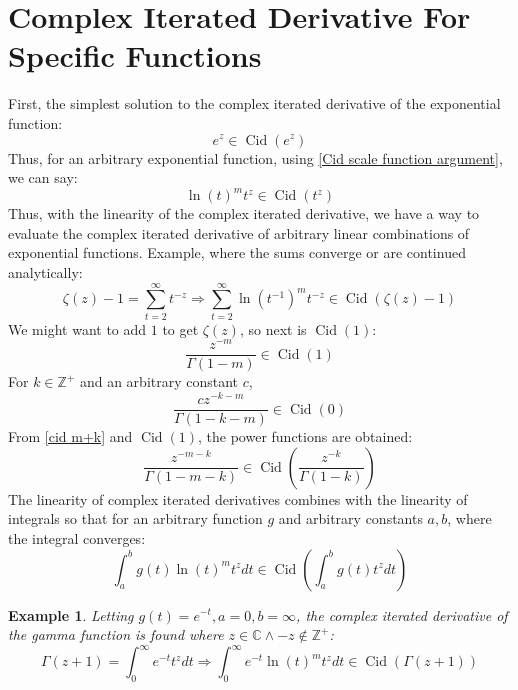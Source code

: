 \documentclass[]{article}
\DeclareMathOperator{\Cid}{Cid}
\newcommand{\pqty}[1]{{\left(#1\right)}}
\newtheorem{example}{Example}[section]
\numberwithin{equation}{section}
\begin{document}
	\section{Complex Iterated Derivative For Specific Functions}
	First, the simplest solution to the complex iterated derivative of the exponential function:
	\begin{equation}
		e^z\in \Cid\pqty{e^z}
	\end{equation}
	Thus, for an arbitrary exponential function, using \eqref{Cid scale function argument}, we can say:
	\begin{equation}
		\ln\pqty{t}^m t^z\in \Cid\pqty{t^z}
	\end{equation}
	Thus, with the linearity of the complex iterated derivative, we have a way to evaluate the complex iterated derivative of arbitrary linear combinations of exponential functions. Example, where the sums converge or are continued analytically:
	\begin{equation}
		\zeta\pqty{z}-1=\sum_{t=2}^{\infty}t^{-z}
		\Rightarrow
		\sum_{t=2}^{\infty}\ln\pqty{t^{-1}}^m t^{-z}\in\Cid\pqty{\zeta\pqty{z}-1}
	\end{equation}
	We might want to add $1$ to get $\zeta\pqty{z}$, so next is $\Cid\pqty{1}$:
	\begin{equation}
		\frac{z^{-m}}{\Gamma\pqty{1-m}}\in\Cid\pqty{1}
	\end{equation}
	For $k\in\mathbb{Z}^+$ and an arbitrary constant $c$,
	\begin{equation}
		\frac{cz^{-k-m}}{\Gamma\pqty{1-k-m}}\in\Cid\pqty{0}
	\end{equation}
	From \eqref{cid m+k} and $\Cid\pqty{1}$, the power functions are obtained:
	\begin{equation}
		\frac{z^{-m-k}}{\Gamma\pqty{1-m-k}}\in\Cid\pqty{\frac{z^{-k}}{\Gamma\pqty{1-k}}}
	\end{equation}
	The linearity of complex iterated derivatives combines with the linearity of integrals so that for an arbitrary function $g$ and arbitrary constants $a,b$, where the integral converges:
	\begin{equation}
		\int_{a}^{b}g\pqty{t}\ln\pqty{t}^m t^z dt
		\in\Cid\pqty{\int_{a}^{b}g\pqty{t}t^z dt}
	\end{equation}
	
	\begin{example}
		Letting $g\pqty{t}=e^{-t},a=0,b=\infty$, the complex iterated derivative of the gamma function is found where $z\in\mathbb{C}\land -z\not\in\mathbb{Z}^+$:
		\begin{equation}
			\Gamma\pqty{z+1} = \int_{0}^{\infty}e^{-t}t^z dt
			\Rightarrow
			\int_{0}^{\infty}e^{-t}\ln\pqty{t}^m t^z dt\in\Cid\pqty{\Gamma\pqty{z+1}}
		\end{equation}
	\end{example}
	
\end{document}
